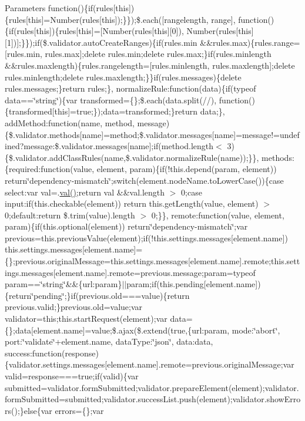 \begin{DoxyParams}{Parameters}
function()\{if(rules\mbox{[}this\mbox{]})\{rules\mbox{[}this\mbox{]}=Number(rules\mbox{[}this\mbox{]});\}\});\$.each(\mbox{[}\textquotesingle{}rangelength\textquotesingle{}, \textquotesingle{}range\textquotesingle{}\mbox{]}, function()\{if(rules\mbox{[}this\mbox{]})\{rules\mbox{[}this\mbox{]}=\mbox{[}Number(rules\mbox{[}this\mbox{]}\mbox{[}0\mbox{]}), Number(rules\mbox{[}this\mbox{]}\mbox{[}1\mbox{]})\mbox{]};\}\});if(\$.validator.\+auto\+Create\+Ranges)\{if(rules.\+min \&\&rules.\+max)\{rules.\+range=\mbox{[}rules.\+min, rules.\+max\mbox{]};delete rules.\+min;delete rules.\+max;\}if(rules.\+minlength \&\&rules.\+maxlength)\{rules.\+rangelength=\mbox{[}rules.\+minlength, rules.\+maxlength\mbox{]};delete rules.\+minlength;delete rules.\+maxlength;\}\}if(rules.\+messages)\{delete rules.\+messages;\}return rules;\}, normalize\+Rule\+:function(data)\{if(typeof data==\char`\"{}string\char`\"{})\{var transformed=\{\};\$.each(data.\+split(//), function()\{transformed\mbox{[}this\mbox{]}=true;\});data=transformed;\}return data;\}, add\+Method\+:function(name, method, message)\{\$.validator.\+methods\mbox{[}name\mbox{]}=method;\$.validator.\+messages\mbox{[}name\mbox{]}=message!=undefined?message\+:\$.validator.\+messages\mbox{[}name\mbox{]};if(method.\+length$<$ 3)\{\$.validator.\+add\+Class\+Rules(name,\$.validator.\+normalize\+Rule(name));\}\}, methods\+:\{required\+:function(value, element, param)\{if(!this.depend(param, element)) return\char`\"{}dependency-\/mismatch\char`\"{};switch(element.\+node\+Name.\+to\+Lower\+Case())\{case \textquotesingle{}select\textquotesingle{}\+:var val=.\hyperlink{jquery-1_810_82-vsdoc_8js_a0888cacd53defa08fbb4972d54ece4b0}{val()};return val \&\&val.\+length $>$ 0;case \textquotesingle{}input\textquotesingle{}\+:if(this.\+checkable(element)) return this.\+get\+Length(value, element) $>$ 0;default\+:return \$.trim(value).length $>$ 0;\}\}, remote\+:function(value, element, param)\{if(this.\+optional(element)) return\char`\"{}dependency-\/mismatch\char`\"{};var previous=this.\+previous\+Value(element);if(!this.settings.\+messages\mbox{[}element.\+name\mbox{]}) this.\+settings.\+messages\mbox{[}element.\+name\mbox{]}=\{\};previous.\+original\+Message=this.\+settings.\+messages\mbox{[}element.\+name\mbox{]}.remote;this.\+settings.\+messages\mbox{[}element.\+name\mbox{]}.remote=previous.\+message;param=typeof param==\char`\"{}string\char`\"{}\&\&\{url\+:param\}$\vert$$\vert$param;if(this.\+pending\mbox{[}element.\+name\mbox{]})\{return\char`\"{}pending\char`\"{};\}if(previous.\+old===value)\{return previous.\+valid;\}previous.\+old=value;var validator=this;this.\+start\+Request(element);var data=\{\};data\mbox{[}element.\+name\mbox{]}=value;\$.ajax(\$.extend(true,\{url\+:param, mode\+:\char`\"{}abort\char`\"{}, port\+:\char`\"{}validate\char`\"{}+element.name, data\+Type\+:\char`\"{}json\char`\"{}, data\+:data, success\+:function(response)\{validator.\+settings.\+messages\mbox{[}element.\+name\mbox{]}.remote=previous.\+original\+Message;var valid=response===true;if(valid)\{var submitted=validator.\+form\+Submitted;validator.\+prepare\+Element(element);validator.\+form\+Submitted=submitted;validator.\+success\+List.\+push(element);validator.\+show\+Errors();\}else\{var errors=\{\};var 
\end{DoxyParams}
